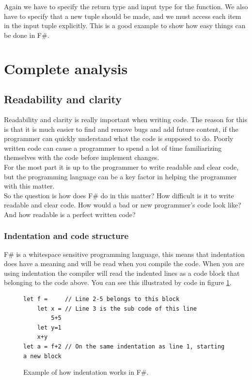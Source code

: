 \documentclass[12pt, a4paper]{article}
\begin{document}
Again we have to specify the return type and input type for the function. We also have to specify that a new tuple should be made, and we must access each item in the input tuple explicitly. This is a good example to show how easy things can be done in F\#.

\newpage
\section{Complete analysis}

\subsection{Readability and clarity}
Readability and clarity is really important when writing code. The reason for this is that it is much easier to find and remove bugs and add future content, if the programmer can quickly understand what the code is supposed to do. Poorly written code can cause a programmer to spend a lot of time familiarizing themselves with the code before implement changes.\\

For the most part it is up to the programmer to write readable and clear code, but the programming language can be a key factor in helping the programmer with this matter.\\

So the question is how does F\# do in this matter? How difficult is it to write readable and clear code. How would a bad or new programmer's code look like? And how readable is a perfect written code?

\newpage
\subsubsection{Indentation and code structure}
\label{indentationAndCodeStructure}
F\# is a whitespace sensitive programming language, this means that indentation does have a meaning and will be read when you compile the code. When you are using indentation the compiler will read the indented lines as a code block that belonging to the code above. You can see this illustrated by code in figure \ref{fig:indentationExample}.

\begin{figure}[!h]
	\begin{lstlisting}
let f = 	// Line 2-5 belongs to this block
	let x = // Line 3 is the sub code of this line
		5+5	
	let y=1
  	x+y
let a = f+2	// On the same indentation as line 1, starting a new block
	\end{lstlisting}
	\caption{Example of how indentation works in F\#.}
	\label{fig:indentationExample}
\end{figure}
\end{document}
